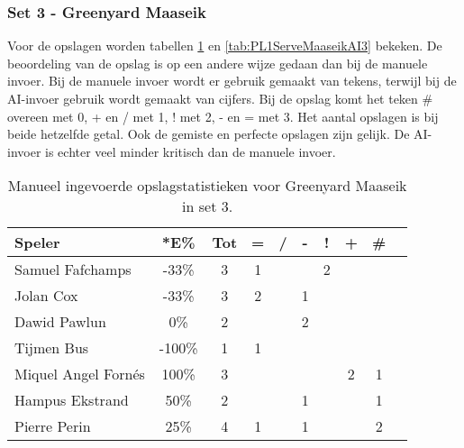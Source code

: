 \subsubsection{Set 3 - Greenyard Maaseik}
\label{sec:PL1_Greenyard3}

Voor de opslagen worden tabellen \ref{tab:PL1ServeMaaseikMan3} en \ref{tab:PL1ServeMaaseikAI3} bekeken. De beoordeling van de opslag is op een andere wijze gedaan dan bij de manuele invoer. Bij de manuele invoer wordt er gebruik gemaakt van tekens, terwijl bij de AI-invoer gebruik wordt gemaakt van cijfers. Bij de opslag komt het teken \# overeen met 0, + en / met 1, ! met 2, - en = met 3.
Het aantal opslagen is bij beide hetzelfde getal. Ook de gemiste en perfecte opslagen zijn gelijk. De AI-invoer is echter veel minder kritisch dan de manuele invoer.

\begin{table}[ht!]
    \centering
    \scriptsize
    \begin{tabular}{|l|c|c|c|c|c|c|c|c|c|} \hline
        \textbf{Speler}& *E\% & Tot & = & / & - & ! & + & \#\\ \hline
        Samuel Fafchamps  & -33\% & 3 & 1 &  &  & 2 &  &  \\ 
        Jolan Cox  & -33\% & 3 & 2 &  & 1 &  &  &  \\ 
        Dawid Pawlun & 0\% & 2 &  &  & 2 &  &  &  \\
        Tijmen Bus & -100\% & 1 & 1 &  &  &  &  &  \\ 
        Miquel Angel Fornés & 100\% & 3 &  &  &  &  & 2 & 1 \\ 
        Hampus Ekstrand & 50\% & 2 &  &  & 1 &  &  & 1 \\ 
        Pierre Perin & 25\% & 4 & 1 &  & 1 &  &  & 2 \\ \hline
    \end{tabular}
    \caption[Manueel ingevoerde opslagstatistieken voor Greenyard Maaseik in set 3]{\label{tab:PL1ServeMaaseikMan3}Manueel ingevoerde opslagstatistieken voor Greenyard Maaseik in set 3.}
\end{table}

